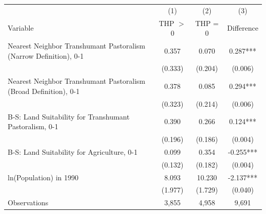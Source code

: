 \begin{tabular}{l*{3}c}
\toprule
 & (1) & (2) & (3) \\
Variable & THP $>$ 0 & THP = 0 & Difference \\
\midrule
Nearest Neighbor Transhumant Pastoralism (Narrow Definition), 0-1&0.357&0.070&0.287***\\
&(0.333)&(0.204)&(0.006)\\
Nearest Neighbor Transhumant Pastoralism (Broad Definition), 0-1&0.378&0.085&0.294***\\
&(0.323)&(0.214)&(0.006)\\
B-S: Land Suitability for Transhumant Pastoralism, 0-1&0.390&0.266&0.124***\\
&(0.196)&(0.186)&(0.004)\\
B-S: Land Suitability for Agriculture, 0-1&0.099&0.354&-0.255***\\
&(0.132)&(0.182)&(0.004)\\
ln(Population) in 1990&8.093&10.230&-2.137***\\
&(1.977)&(1.729)&(0.040)\\
\midrule
Observations & 3,855 & 4,958 & 9,691 \\
\bottomrule
\end{tabular}
